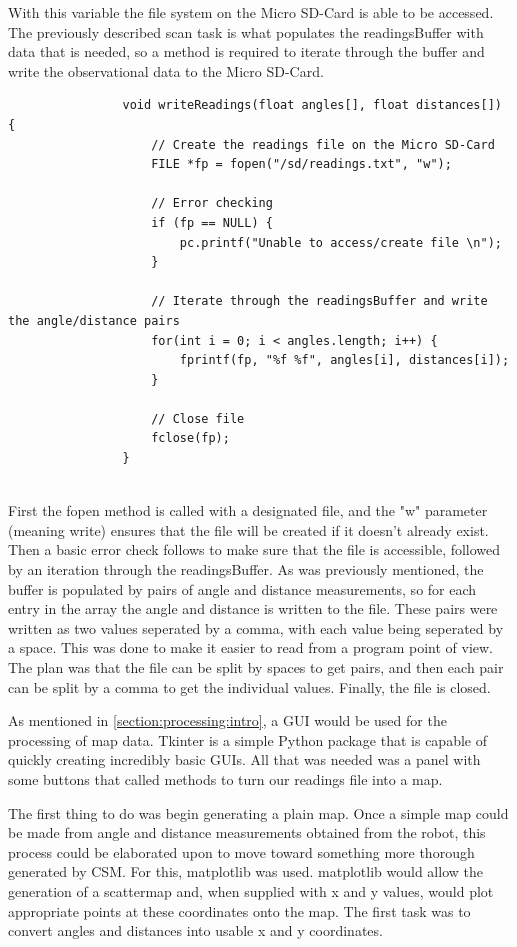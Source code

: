				With this variable the file system on the Micro SD-Card is able to be accessed. The previously described scan task is what populates the readingsBuffer with data that is needed, so a method is required to iterate through the buffer and write the observational data to the Micro SD-Card.
				
				\begin{lstlisting}
				void writeReadings(float angles[], float distances[]) {
					// Create the readings file on the Micro SD-Card
					FILE *fp = fopen("/sd/readings.txt", "w");
					
					// Error checking
					if (fp == NULL) {
						pc.printf("Unable to access/create file \n");
					}
					
					// Iterate through the readingsBuffer and write the angle/distance pairs
					for(int i = 0; i < angles.length; i++) {
						fprintf(fp, "%f %f", angles[i], distances[i]);
					}
					
					// Close file
					fclose(fp);
				}
				
				\end{lstlisting}
				First the fopen method is called with a designated file, and the "w" parameter (meaning write) ensures that the file will be created if it doesn't already exist. Then a basic error check follows to make sure that the file is accessible, followed by an iteration through the readingsBuffer. As was previously mentioned, the buffer is populated by pairs of angle and distance measurements, so for each entry in the array the angle and distance is written to the file. These pairs were written as two values seperated by a comma, with each value being seperated by a space. This was done to make it easier to read from a program point of view. The plan was that the file can be split by spaces to get pairs, and then each pair can be split by a comma to get the individual values. Finally, the file is closed.
				
				As mentioned in \ref{section:processing:intro}, a GUI would be used for the processing of map data. Tkinter is a simple Python package that is capable of quickly creating incredibly basic GUIs. All that was needed was a panel with some buttons that called methods to turn our readings file into a map.
				
				The first thing to do was begin generating a plain map. Once a simple map could be made from angle and distance measurements obtained from the robot, this process could be elaborated upon to move toward something more thorough generated by CSM. For this, matplotlib was used. matplotlib would allow the generation of a scattermap and, when supplied with x and y values, would plot appropriate points at these coordinates onto the map. The first task was to convert angles and distances into usable x and y coordinates.
				
